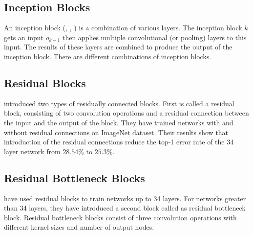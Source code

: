\subsection{Inception Blocks}
An inception block (\cite{Szegedy:2014aa}, \cite{Szegedy_2016_CVPR}, \cite{DBLP:journals/corr/SzegedyIV16}) is a combination of various layers. The inception block $k$ gets an input $o_{k-1}$ then applies multiple convolutional (or pooling) layers to this input. The results of these layers are combined to produce the output of the inception block. There are different combinations of inception blocks. 
\fi

\subsection{Residual Blocks}
\cite{He:2015aa} introduced two types of residually connected blocks. First is called a residual block, consisting of two convolution operations and a residual connection between the input and the output of the block. They have trained networks with and without residual connections on ImageNet dataset. Their results show that introduction of the residual connections reduce the top-1 error rate of the 34 layer network from $28.54\%$ to $25.3\%$.

\subsection{Residual Bottleneck Blocks}
\cite{He:2015aa} have used residual blocks to train networks up to 34 layers. For networks greater than 34 layers, they have introduced a second block called as residual bottleneck block. Residual bottleneck blocks consist of three convolution operations with different kernel sizes and number of output nodes. 

